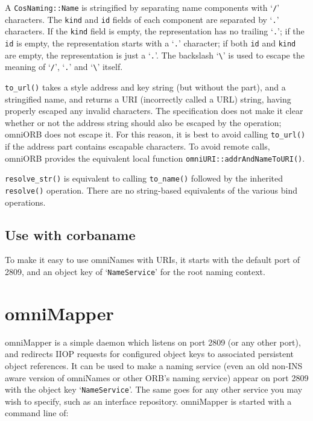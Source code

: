 \documentclass[11pt,oneside,a4paper]{book}
\newcommand{\type}[1]{\texttt{#1}}
\newcommand{\code}[1]{\texttt{#1}}
\newcommand{\op}[1]{\texttt{#1()}}
\newcommand{\dsc}{\discretionary{}{}{}}
\begin{document}
A \type{CosNaming::Name} is stringified by separating name components
with `\texttt{/}' characters. The \code{kind} and \code{id} fields of
each component are separated by `\texttt{.}' characters. If the
\code{kind} field is empty, the representation has no trailing
`\texttt{.}'; if the \code{id} is empty, the representation starts
with a `\texttt{.}' character; if both \texttt{id} and \texttt{kind}
are empty, the representation is just a `\texttt{.}'. The backslash
`\texttt{\textbackslash}' is used to escape the meaning of
`\texttt{/}', `\texttt{.}' and `\texttt{\textbackslash}' itself.

\op{to\_url} takes a  style address and key string
(but without the  part), and a stringified name,
and returns a  URI (incorrectly called a URL)
string, having properly escaped any invalid characters. The
specification does not make it clear whether or not the address string
should also be escaped by the operation; omniORB does not escape
it. For this reason, it is best to avoid calling \op{to\_url} if the
address part contains escapable characters.  To avoid remote calls,
omniORB provides the equivalent local function
\op{omniURI::\dsc{}addrAndNameToURI}.

\op{resolve\_str} is equivalent to calling \op{to\_name} followed by
the inherited \op{resolve} operation. There are no string-based
equivalents of the various bind operations.


\subsection{Use with corbaname}

To make it easy to use omniNames with  URIs, it
starts with the default port of 2809, and an object key of
`\texttt{NameService}' for the root naming context.


\section{omniMapper}

omniMapper is a simple daemon which listens on port 2809 (or any other
port), and redirects IIOP requests for configured object keys to
associated persistent object references. It can be used to make a
naming service (even an old non-INS aware version of omniNames or
other ORB's naming service) appear on port 2809 with the object key
`\texttt{NameService}'. The same goes for any other service you may
wish to specify, such as an interface repository. omniMapper is
started with a command line of:
\end{document}
